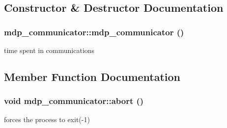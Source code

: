 \subsection{Constructor \& Destructor Documentation}
\hypertarget{classmdp__communicator_a9c38d613d17973364b3121d8e8b03301}{
\subsubsection[{mdp\_\-communicator}]{\setlength{\rightskip}{0pt plus 5cm}mdp\_\-communicator::mdp\_\-communicator ()}}
\label{classmdp__communicator_a9c38d613d17973364b3121d8e8b03301}


time spent in communications 

\subsection{Member Function Documentation}
\hypertarget{classmdp__communicator_aa601b7788f242a7f71b955a6bdf7e002}{
\subsubsection[{abort}]{\setlength{\rightskip}{0pt plus 5cm}void mdp\_\-communicator::abort ()}}
\label{classmdp__communicator_aa601b7788f242a7f71b955a6bdf7e002}


forces the process to exit(-\/1) 

